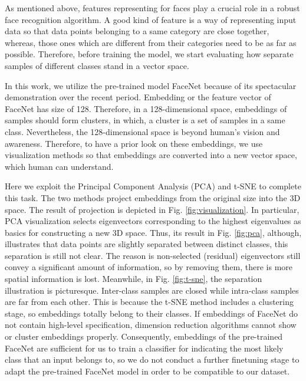 \documentclass[journal, twocolumn]{IEEEtran}
\begin{document}
As mentioned above, features representing for faces play a crucial role in a robust face recognition algorithm. A good kind of feature is a way of representing input data so that data points belonging to a same category are close together, whereas, those ones which are different from their categories need to be as far as possible. Therefore, before training the model, we start evaluating how separate samples of different classes stand in a vector space.

In this work, we utilize the pre-trained model FaceNet because of its spectacular demonstration over the recent period. Embedding or the feature vector of FaceNet has size of 128. Therefore, in a 128-dimensional space, embeddings of samples should form clusters, in which, a cluster is a set of samples in a same class. Nevertheless, the 128-dimensional space is beyond human's vision and awareness. Therefore, to have a prior look on these embeddings, we use visualization methods so that embeddings are converted into a new vector space, which human can understand.

Here we exploit the Principal Component Analysis (PCA) and t-SNE \cite{ref:t-sne} to complete this task. The two methods project embeddings from the original size into the 3D space. The result of projection is depicted in Fig. \ref{fig:visualization}. In particular, PCA visualization selects eigenvectors corresponding to the highest eigenvalues as basics for constructing a new 3D space. Thus, its result in Fig. \ref{fig:pca}, although, illustrates that data points are slightly separated between distinct classes, this separation is still not clear. The reason is non-selected (residual) eigenvectors still convey a significant amount of information, so by removing them, there is more spatial information is lost. Meanwhile, in Fig. \ref{fig:t-sne}, the separation illustration is picturesque. Inter-class samples are closed while intra-class samples are far from each other. This is because the t-SNE method includes a clustering stage, so embeddings totally belong to their classes. If embeddings of FaceNet do not contain high-level specification, dimension reduction algorithms cannot show or cluster embeddings properly. Consequently, embeddings of the pre-trained FaceNet are sufficient for us to train a classifier for indicating the most likely class that an input belongs to, so we do not conduct a further finetuning stage to adapt the pre-trained FaceNet model in order to be compatible to our dataset.


\end{document}
